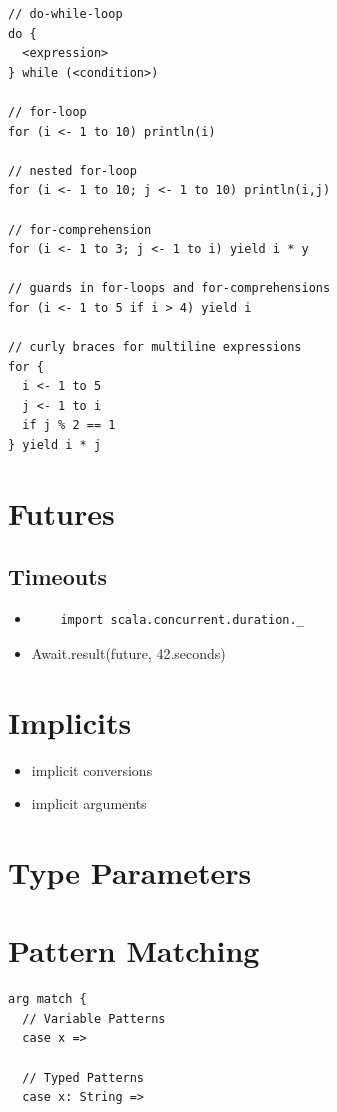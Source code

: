 \documentclass[10pt,landscape,a4paper]{article}
\begin{document}
\begin{multicols*}{4}
\begin{verbatim}
// do-while-loop
do {
  <expression>
} while (<condition>)

// for-loop
for (i <- 1 to 10) println(i)

// nested for-loop
for (i <- 1 to 10; j <- 1 to 10) println(i,j)

// for-comprehension
for (i <- 1 to 3; j <- 1 to i) yield i * y

// guards in for-loops and for-comprehensions
for (i <- 1 to 5 if i > 4) yield i

// curly braces for multiline expressions
for {
  i <- 1 to 5
  j <- 1 to i
  if j % 2 == 1
} yield i * j
\end{verbatim}

\section{Futures}

\subsection{Timeouts}
\begin{itemize}
\item
  \begin{verbatim}
    import scala.concurrent.duration._
  \end{verbatim}
\item Await.result(future, 42.seconds)
\end{itemize}

\section{Implicits}
\begin{itemize}
\item implicit conversions
\item implicit arguments
\end{itemize}

\section{Type Parameters}

\section{Pattern Matching}
\begin{verbatim}
arg match {
  // Variable Patterns
  case x =>

  // Typed Patterns
  case x: String =>


\end{verbatim}
\end{multicols*}
\end{document}
